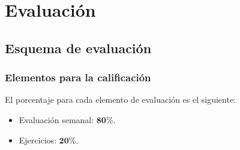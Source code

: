 \documentclass[12pt]{beamer}
\begin{document}


\section{Evaluación}
\subsection{Esquema de evaluación}

\begin{frame}
\frametitle{Elementos para la calificación}
El porcentaje para cada elemento de evaluación es el siguiente:
\pause
\begin{itemize}[<+->]
\setlength{\itemsep}{0mm}
\item Evaluación semanal: $\mathbf{80\%}$.
\item Ejercicios: $\mathbf{20\%}$.
\end{itemize}
\end{frame}
\end{document}
